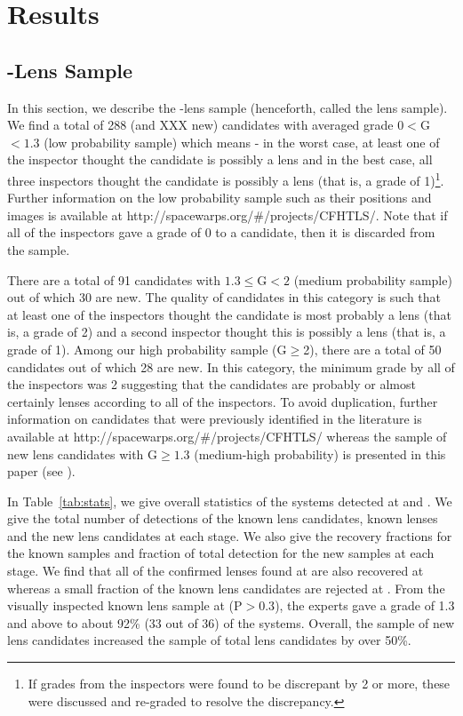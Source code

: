\documentclass[useAMS,usenatbib,a4paper]{mn2e}
\begin{document}
\section{Results}
\label{sec:results}

\subsection{\sw-\cfhtls Lens Sample}
\label{sec:swlens}

In this section, we describe the \sw-\cfhtls lens sample (henceforth,
called the \sw lens sample). We find a total of 288 (and XXX new)
candidates with averaged grade $0<$G$<1.3$ (low probability sample)
which means - in the worst case, at least one of the inspector thought
the candidate is possibly a lens and in the best case, all three
inspectors thought the candidate is possibly a lens (that is,
a grade of 1)\footnote{If grades from the inspectors were found to be discrepant
by 2 or more, these were discussed and re-graded to resolve the
discrepancy.}. Further information on the low probability sample such as
their positions and images is available at
http://spacewarps.org/\#/projects/CFHTLS/. Note that if all of the inspectors gave
a grade of 0 to a candidate, then it is discarded from the sample.

There are a total of 91 candidates with $1.3\le$G$<2$ (medium
probability sample) out of which 30 are new. The quality of candidates
in this category is such that at least one of the inspectors thought the
candidate is most probably a lens (that is, a grade of 2) and a second inspector
thought this is possibly a lens (that is, a grade of 1). Among our high
probability sample (G$\ge$2), there are a total of 50 candidates out of
which 28 are new. In this category, the minimum grade by all of the
inspectors was 2 suggesting that the candidates are probably or almost
certainly lenses according to all of the inspectors. To avoid
duplication, further information on \sw candidates that were previously
identified in the literature is available at
http://spacewarps.org/\#/projects/CFHTLS/ whereas the sample of new lens
candidates with G$\ge 1.3$ (medium-high probability) is presented in this paper (see
).

In Table~\ref{tab:stats}, we give overall statistics of the systems
detected at \StageOne and \StageTwo. We give the total number of
detections of the known lens candidates, known lenses and the new lens
candidates at each stage.  We also give the recovery fractions for the
known samples and fraction of total detection for the new samples at
each stage. We find that all of the confirmed lenses found
at \StageOne are also recovered at \StageTwo whereas a small fraction of
the known lens candidates are rejected at \StageTwo. From the visually
inspected known lens sample at \StageTwo (P$> 0.3$), the experts gave a
grade of 1.3 and above to about 92\% (33 out of 36) of the systems. Overall,
the sample of new \sw lens candidates increased the sample of total
\cfhtls lens candidates by over 50\%.
\end{document}
